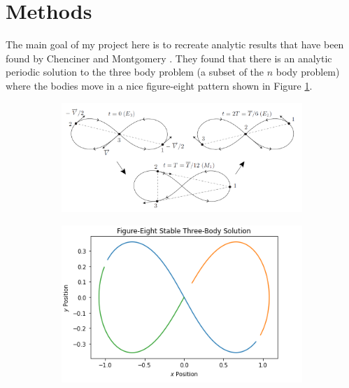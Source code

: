 \documentclass{article}
\begin{document}
\section*{Methods}
The main goal of my project here is to recreate analytic results that have been found by Chenciner and Montgomery \cite{Solution}. They found that there is an analytic periodic solution to the three body problem (a subset of the $n$ body problem) where the bodies move in a nice figure-eight pattern shown in Figure \ref{sfig:Figure_Eight_Solution}. \medskip

\begin{figure}[ht]
	\centering
	\begin{subfigure}{0.49\textwidth}
		\centering
		\includegraphics[width = \textwidth]{Figure_Eight_Solution.png}
		\caption{}
		\label{sfig:Figure_Eight_Solution}
	\end{subfigure}
	\begin{subfigure}{0.49\textwidth}
		\centering
		\includegraphics[width = \textwidth]{Figure_Eight_Solution_Simulation.png}
		\caption{}
		\label{sfig:Figure_Eight_Solution_Simulation}
	\end{subfigure}
	\caption{}
\end{figure}
\end{document}
